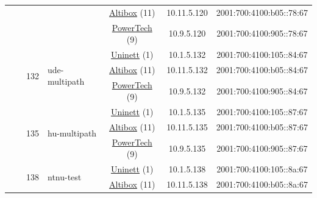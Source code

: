 \begin{small}
\begin{center}
\begin{longtable}{|c|c|c|c|c|c|c|c|}
  &  &  &  & \multicolumn{2}{|c|}{\tiny{\href{https://www.altibox.no}{Altibox} (11)}} & \tiny{10.11.5.120} & \tiny{2001:700:4100:b05::78:67} \\* \cline{5-5}\cline{6-6}\cline{7-7}\cline{8-8}
  &  &  &  & \multicolumn{2}{|c|}{\tiny{\href{http://www.powertech.no}{PowerTech} (9)}} & \tiny{10.9.5.120} & \tiny{2001:700:4100:905::78:67} \\* \cline{3-3}\cline{4-4}\cline{5-5}\cline{6-6}\cline{7-7}\cline{8-8}
  &  & \multirow{3}{*}{\tiny{132}} & \multicolumn{1}{|l|}{\multirow{3}{*}{\tiny{ude-multipath}}} & \multicolumn{2}{|c|}{\tiny{\href{https://www.uninett.no}{Uninett} (1)}} & \tiny{10.1.5.132} & \tiny{2001:700:4100:105::84:67} \\* \cline{5-5}\cline{6-6}\cline{7-7}\cline{8-8}
  &  &  &  & \multicolumn{2}{|c|}{\tiny{\href{https://www.altibox.no}{Altibox} (11)}} & \tiny{10.11.5.132} & \tiny{2001:700:4100:b05::84:67} \\* \cline{5-5}\cline{6-6}\cline{7-7}\cline{8-8}
  &  &  &  & \multicolumn{2}{|c|}{\tiny{\href{http://www.powertech.no}{PowerTech} (9)}} & \tiny{10.9.5.132} & \tiny{2001:700:4100:905::84:67} \\* \cline{3-3}\cline{4-4}\cline{5-5}\cline{6-6}\cline{7-7}\cline{8-8}
  &  & \multirow{3}{*}{\tiny{135}} & \multicolumn{1}{|l|}{\multirow{3}{*}{\tiny{hu-multipath}}} & \multicolumn{2}{|c|}{\tiny{\href{https://www.uninett.no}{Uninett} (1)}} & \tiny{10.1.5.135} & \tiny{2001:700:4100:105::87:67} \\* \cline{5-5}\cline{6-6}\cline{7-7}\cline{8-8}
  &  &  &  & \multicolumn{2}{|c|}{\tiny{\href{https://www.altibox.no}{Altibox} (11)}} & \tiny{10.11.5.135} & \tiny{2001:700:4100:b05::87:67} \\* \cline{5-5}\cline{6-6}\cline{7-7}\cline{8-8}
  &  &  &  & \multicolumn{2}{|c|}{\tiny{\href{http://www.powertech.no}{PowerTech} (9)}} & \tiny{10.9.5.135} & \tiny{2001:700:4100:905::87:67} \\* \cline{3-3}\cline{4-4}\cline{5-5}\cline{6-6}\cline{7-7}\cline{8-8}
  &  & \multirow{3}{*}{\tiny{138}} & \multicolumn{1}{|l|}{\multirow{3}{*}{\tiny{ntnu-test}}} & \multicolumn{2}{|c|}{\tiny{\href{https://www.uninett.no}{Uninett} (1)}} & \tiny{10.1.5.138} & \tiny{2001:700:4100:105::8a:67} \\* \cline{5-5}\cline{6-6}\cline{7-7}\cline{8-8}
  &  &  &  & \multicolumn{2}{|c|}{\tiny{\href{https://www.altibox.no}{Altibox} (11)}} & \tiny{10.11.5.138} & \tiny{2001:700:4100:b05::8a:67} \\* \cline{5-5}\cline{6-6}\cline{7-7}\cline{8-8}

\end{longtable}
\end{center}
\end{small}

